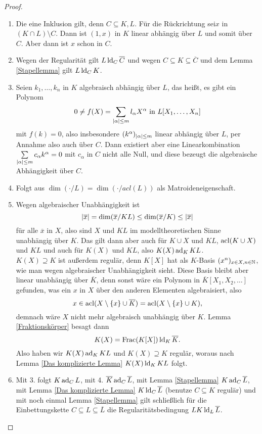     \begin{proof}
    	\ 
    	\begin{enumerate}
    		\item Die eine Inklusion gilt, denn $C\subseteq K,L$. Für die Rückrichtung sei\linebreak$x$ in $(K\cap L)\setminus C$. Dann ist $(1,x)$ in $K$ linear abhängig über $L$ und somit über $C$. Aber dann ist $x$ schon in $C$.
    		\item Wegen der Regularität gilt $L\operatorname{ld}_C\overline{C}$ und wegen $C\subseteq K\subseteq\overline{C}$ und dem Lemma \ref{Stapellemma} gilt $L\operatorname{ld}_C K$.
    		\item Seien $k_1,\dots,k_n$ in $K$ algebraisch abhängig über $L$, das heißt, es gibt ein Polynom $$0\neq f(X)=\sum\limits_{{\left| \alpha \right|}\leq m}l_\alpha X^\alpha\text{ in }L[X_1,\dots,X_n]$$ mit $f(k)=0$, also insbesondere $(k^\alpha)_{{\left| \alpha \right|}\leq m}$ linear abhängig über $L$, per Annahme also auch über $C$. Dann existiert aber eine Linearkombination $\sum\limits_{{\left| \alpha \right|}\leq m}c_\alpha k^\alpha=0$ mit $c_\alpha$ in $C$ nicht alle Null, und diese bezeugt die algebraische Abhängigkeit über $C$.
    		\item Folgt aus $\dim(\cdot/L)=\dim(\cdot/acl(L))$ als Matroideneigenschaft.
    		\item Wegen algebraischer Unabhängigkeit ist $${\left| \overline{x} \right|}=\dim(\overline{x}/KL)\leq\dim(\overline{x}/K)\leq{\left| \overline{x} \right|}$$ für alle $\overline{x}$ in $X$, also sind $X$ und $KL$ im modelltheoretischen Sinne unabhängig über $K$. Das gilt dann aber auch für $K\cup X$ und $KL$, $\operatorname{acl}(K\cup X)$ und $KL$ und auch für $K(X)$ und $KL$, also $K(X)\operatorname{ad}_KKL$.\\
    		$K(X)\supseteq K$ ist außerdem regulär, denn $K[X]$ hat als $K$-Basis $(x^n)_{x\in X,n\in\mathbb{N}}$, wie man wegen algebraischer Unabhängigkeit sieht. Diese Basis bleibt aber linear unabhängig über $\overline{K}$, denn sonst wäre ein Polynom in $\overline{K}[X_1,X_2,\dots]$ gefunden, was ein $x$ in $X$ über den anderen Elementen algebraisiert, also $$x\in\operatorname{acl}(X\setminus\{x\}\cup\overline{K})=\operatorname{acl}(X\setminus\{x\}\cup K),$$ demnach wäre $X$ nicht mehr algebraisch unabhängig über $K$. Lemma \ref{Fraktionskörper} besagt dann $$K(X)=\operatorname{Frac}(K[X])\operatorname{ld}_K\overline{K}.$$
    		Also haben wir $K(X)\operatorname{ad}_KKL$ und $K(X)\supseteq K$ regulär, woraus nach Lemma \ref{Das komplizierte Lemma} $K(X)\operatorname{ld}_KKL$ folgt.
    		\item Mit 3. folgt $K\operatorname{ad}_CL$, mit 4. $\overline{K}\operatorname{ad}_C\overline{L}$, mit Lemma \ref{Stapellemma} $K\operatorname{ad}_C\overline{L}$, mit Lemma \ref{Das komplizierte Lemma} $K\operatorname{ld}_C\overline{L}$ (benutze $C\subseteq K$ regulär) und mit noch einmal Lemma \ref{Stapellemma} gilt schließlich für die Einbettungskette $C\subseteq L\subseteq\overline{L}$ die Regularitätsbedingung $LK\operatorname{ld}_L\overline{L}$.
    	\end{enumerate}
    \end{proof}
    
